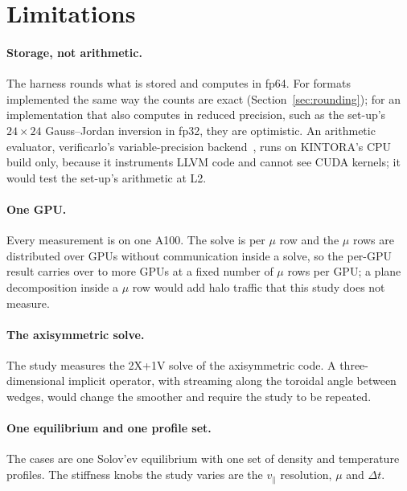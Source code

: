 \documentclass[11pt]{article}
\newcommand{\vpar}{v_\parallel}
\begin{document}
\section{Limitations}
\label{sec:limitations}

\paragraph{Storage, not arithmetic.}  The harness rounds what is stored and computes in fp64.  For
formats implemented the same way the counts are exact (Section~\ref{sec:rounding}); for an
implementation that also computes in reduced precision, such as the set-up's $24 \times 24$
Gauss--Jordan inversion in fp32, they are optimistic.  An arithmetic evaluator, verificarlo's
variable-precision backend~\cite{verificarlo}, runs on KINTORA's CPU build only, because it
instruments LLVM code and cannot see CUDA kernels; it would test the set-up's arithmetic at L2.

\paragraph{One GPU.}  Every measurement is on one A100.  The solve is per $\mu$ row and the
$\mu$ rows are distributed over GPUs without communication inside a solve, so the per-GPU result
carries over to more GPUs at a fixed number of $\mu$ rows per GPU; a plane decomposition inside
a $\mu$ row would add halo traffic that this study does not measure.

\paragraph{The axisymmetric solve.}  The study measures the 2X+1V solve of the axisymmetric code.
A three-dimensional implicit operator, with streaming along the toroidal angle between wedges,
would change the smoother and require the study to be repeated.

\paragraph{One equilibrium and one profile set.}  The cases are one Solov'ev equilibrium with one
set of density and temperature profiles.  The stiffness knobs the study varies are the $\vpar$
resolution, $\mu$ and $\Delta t$.

\end{document}
